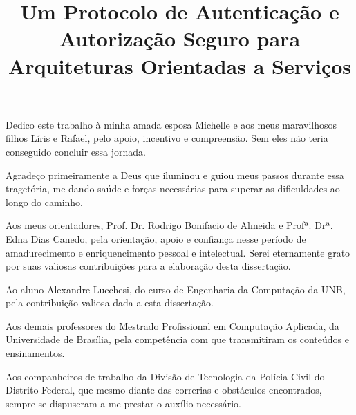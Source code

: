 \documentclass[mpca]{unb-cic}
\title{Um Protocolo de Autenticação e Autorização Seguro para Arquiteturas Orientadas a Serviços}%
\begin{document}
  \maketitle
   
  
  \begin{dedicatoria}
  Dedico este trabalho à minha amada esposa Michelle e aos meus maravilhosos filhos Líris e Rafael, pelo apoio, incentivo e compreensão. Sem eles não teria conseguido concluir essa jornada.

  \end{dedicatoria}

  \begin{agradecimentos}
   Agradeço primeiramente a Deus que iluminou e guiou meus passos durante essa tragetória, me dando saúde e forças necessárias para superar as dificuldades ao longo do caminho.

   Aos meus orientadores, Prof. Dr. Rodrigo Bonifacio de Almeida e Profª. Drª. Edna Dias Canedo, pela orientação, apoio e confiança nesse período de amadurecimento e enriquencimento pessoal e intelectual. Serei eternamente grato por suas valiosas contribuições para a elaboração desta dissertação.

   Ao aluno Alexandre Lucchesi, do curso de Engenharia da Computação da UNB, pela contribuição valiosa dada a esta dissertação.

   Aos demais professores do Mestrado Profissional em Computação Aplicada, da Universidade de Brasília, pela competência com que transmitiram os conteúdos e ensinamentos.

   Aos companheiros de trabalho da Divisão de Tecnologia da Polícia Civil do Distrito Federal, que mesmo diante das correrias e obstáculos encontrados, sempre se dispuseram a me prestar o auxílio necessário.


  \end{agradecimentos}

\end{document}
